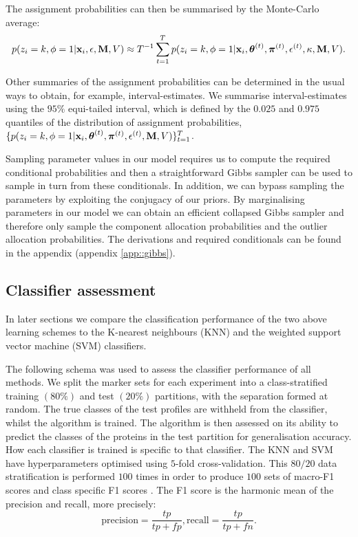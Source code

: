 \documentclass[12pt,english]{article}
\begin{document}
The assignment probabilities can then be summarised by the
Monte-Carlo average:
\[p(z_i = k, \phi = 1 | {\bf x}_i, \epsilon, {\bf M}, V) \approx T^{-1}\sum_{t=1}^{T}p(z_i = k, \phi = 1 | {\bf x}_i, \boldsymbol{\theta}^{(t)}, \boldsymbol{\pi}^{(t)} , \epsilon^{(t)}, \kappa, {\bf M}, V).\]

Other summaries of the assignment probabilities
can be determined in the usual ways to obtain, for example,
interval-estimates. We summarise interval-estimates using the $95\%$ equi-tailed interval, which is defined by the $0.025$ and $0.975$ quantiles of the distribution of assignment probabilities, $\{p(z_i = k, \phi = 1 | {\bf x}_i, \boldsymbol{\theta}^{(t)}, \boldsymbol{\pi}^{(t)} , \epsilon^{(t)}, {\bf M}, V) \}_{t=1}^T$.

Sampling parameter values in our model requires us to compute the required conditional probabilities
and then a straightforward Gibbs sampler can be used to sample in turn from these conditionals. In addition,
we can bypass sampling the parameters by exploiting the conjugacy of our priors. By marginalising parameters
in our model we can obtain an efficient collapsed Gibbs sampler and therefore only sample the component allocation
probabilities and the outlier allocation probabilities. The derivations and required conditionals
can be found in the appendix (appendix \ref{app::gibbs}).

\subsection{Classifier assessment}\label{section::assessment}
In later sections we compare the classification performance of
the two above learning schemes to the K-nearest
neighbours (KNN) and the weighted support vector machine
(SVM) classifiers.

The following schema was used to assess the classifier
performance of all methods. We split the marker sets for each
experiment into a class-stratified training $(80\%)$ and test $(20\%)$
partitions, with the separation formed at random. The true classes of
the test profiles are withheld from the classifier, whilst the
algorithm is trained. The algorithm is
then assessed on its ability to predict the classes of the proteins in the
test partition for generalisation accuracy. How each classifier is trained is
specific to that classifier.
The KNN and SVM have hyperparameters optimised using $5$-fold
cross-validation. This $80/20$ data stratification is performed $100$
times in order to produce $100$ sets of macro-F1
\citep{He::2009} scores and class specific F1 scores \citep{Breckels:2016}. The F1
score is the harmonic mean of the precision and recall, more
precisely:
\[\text{precision}=\frac{tp}{tp+fp}, \text{recall} = \frac{tp}{tp+fn}.\]
\end{document}
